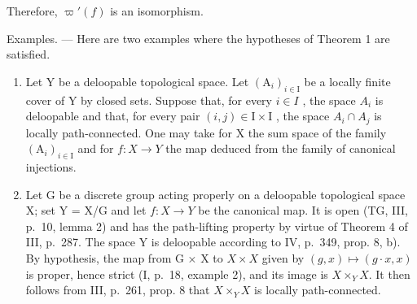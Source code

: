 Therefore, \(\varpi'(f)\) is an isomorphism.

Examples. --- Here are two examples where the hypotheses of Theorem 1 are satisfied.

\begin{enumerate}
\def\labelenumi{\arabic{enumi})}
\item
  Let Y be a deloopable topological space. Let \((\mathrm{A}_{i})_{i\in\mathrm{I}}\) be a locally finite cover of Y by closed sets. Suppose that, for every \(i\in I\) , the space \(A_{i}\) is deloopable and that, for every pair \((i,j)\in\mathrm{I}\times\mathrm{I}\) , the space \(A_{i}\cap A_{j}\) is locally path-connected. One may take for X the sum space of the family \((\mathrm{A}_{i})_{i\in\mathrm{I}}\) and for \(f:X\to Y\) the map deduced from the family of canonical injections.
\item
  Let G be a discrete group acting properly on a deloopable topological space X; set Y = X/G and let \(f: X \to Y\) be the canonical map. It is open (TG, III, p.~10, lemma 2) and has the path-lifting property by virtue of Theorem 4 of III, p.~287. The space Y is deloopable according to IV, p.~349, prop. 8, b). By hypothesis, the map from G × X to \(X\times X\) given by \((g, x) \mapsto (g \cdot x, x)\) is proper, hence strict (I, p.~18, example 2), and its image is \(X\times_{Y}X\). It then follows from III, p.~261, prop. 8 that \(X\times_{Y}X\) is locally path-connected.
\end{enumerate}

